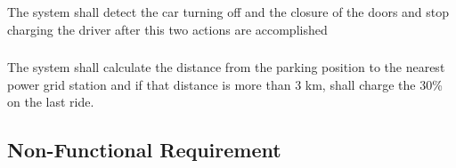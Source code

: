 \subsubsection{}


\subsubsection{}
\begin{itemize}
	\reqcounter The system shall detect the car turning off and the closure of the doors and stop charging the driver after this two actions are accomplished
	
\end{itemize}


\subsubsection{}
\begin{itemize}
	\reqcounter The system shall calculate the distance from the parking position to the nearest power grid station and if that distance is more than 3 km, shall charge the 30\% on the last ride. 
	
\end{itemize}


\subsubsection{}

\subsection{Non-Functional Requirement}



